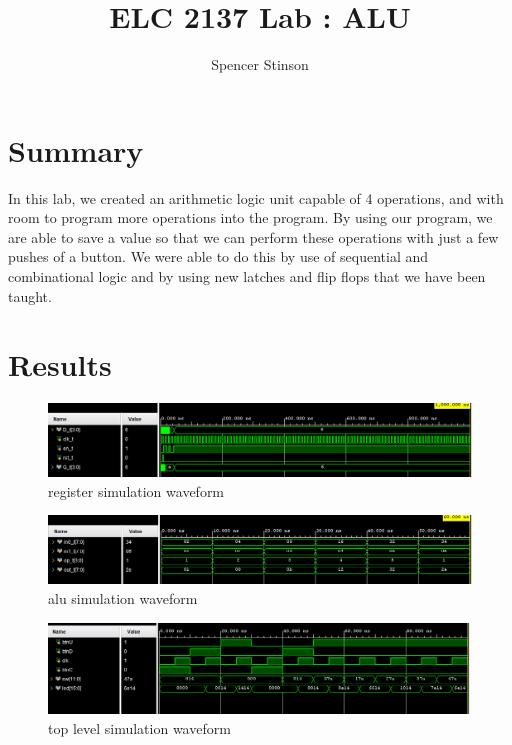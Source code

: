 \documentclass[11pt]{article}
\begin{document}
\title{ELC 2137 Lab : ALU}
\author{Spencer Stinson}

\maketitle


\section*{Summary}
In this lab, we created an arithmetic logic unit capable of 4 operations, and with room to program more operations into the program. By using our program, we are able to save a value so that we can perform these operations with just a few pushes of a button. We were able to do this by use of sequential and combinational logic and by using new latches and flip flops that we have been taught. 

\section*{Results}

\begin{figure}[ht]\centering
	\includegraphics[width= \textwidth ]{regsw.png}
	\caption{register simulation waveform}
	\label{fig: regsw}
\end{figure}

\begin{figure}[ht]\centering
	\includegraphics[width= \textwidth ]{alusw.png}
	\caption{alu simulation waveform}
	\label{fig: alusw}
\end{figure}

\begin{figure}[ht]\centering
	\includegraphics[width= \textwidth ]{swtls.png}
	\caption{top level simulation waveform}
	\label{fig: tlsw}
\end{figure}
\end{document}
